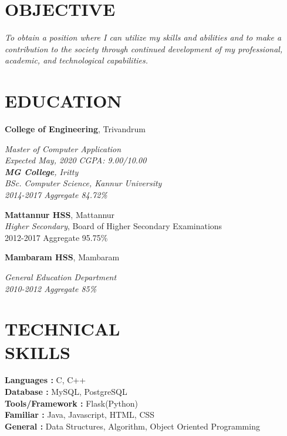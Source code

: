 \documentclass[margin]{res}
\begin{document}
\begin{resume}

\section{OBJECTIVE}
{\sl To obtain a position where I can utilize my skills and abilities and to make a contribution
to the society through continued development of my professional, academic, and technological
capabilities. }

\section{EDUCATION}
\textbf{College of Engineering}, Trivandrum\\
{\sl Master of Computer Application\\
Expected May, 2020
\hfill CGPA: 9.00/10.00\\

\textbf{MG College}, Iritty \\
{\sl BSc. Computer Science}, Kannur University\\
2014-2017
\hfill Aggregate 84.72\%

\textbf{Mattannur HSS}, Mattannur \\
{\sl Higher Secondary}, Board of Higher
Secondary Examinations\\
2012-2017
\hfill Aggregate 95.75\%

\textbf{Mambaram HSS}, Mambaram \\
{\sl General Education
Department\\
2010-2012
\hfill Aggregate 85\%





\section{TECHNICAL\\SKILLS}

\textbf{Languages : }  C, C++
\\
\textbf{Database :} MySQL, PostgreSQL
\\
\textbf{Tools/Framework : } Flask(Python)
\\
\textbf{Familiar : } Java, Javascript, HTML, CSS
\\
\textbf{General : } Data Structures, Algorithm, Object Oriented Programming

}}
\end{resume}
\end{document}
